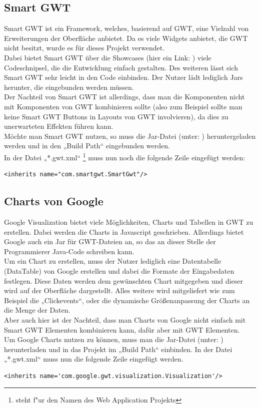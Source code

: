 \documentclass[12pt,a4paper,twoside]{article}
\begin{document}
\subsection{Smart GWT}
Smart GWT ist ein Framework, welches, basierend auf GWT, eine Vielzahl von Erweiterungen der Oberfläche anbietet. Da es viele Widgets anbietet, die GWT nicht besitzt, wurde es für dieses Projekt verwendet.\\
Dabei bietet Smart GWT über die Showcases (hier ein Link: \cite{smartgwt}) viele Codeschnipsel, die die Entwicklung  einfach gestalten. Des weiteren lässt sich Smart GWT sehr leicht in den Code einbinden. Der Nutzer lädt lediglich Jars herunter, die eingebunden werden müssen. \\
Der Nachteil von Smart GWT ist allerdings, dass man die Komponenten nicht mit Komponenten von GWT kombinieren sollte (also zum Beispiel sollte man keine Smart GWT Buttons in Layouts von GWT involvieren), da dies zu unerwarteten Effekten führen kann.\\
\newline
Möchte man Smart GWT nutzen, so muss die Jar-Datei (unter: \cite{smartgwtdown}) heruntergeladen werden und in den „Build Path“ eingebunden werden.\\
In der Datei „*.gwt.xml“ \footnote{steht f"ur den Namen des Web Application Projekts} muss nun noch die folgende Zeile eingefügt werden:

\lstset{language=HTML}
\begin{lstlisting}
<inherits name="com.smartgwt.SmartGwt"/>
\end{lstlisting}

\subsection{Charts von Google}
Google Visualization bietet viele Möglichkeiten, Charts und Tabellen in GWT zu erstellen. Dabei werden die Charts in Javascript geschrieben. Allerdings bietet Google auch ein Jar für GWT-Dateien an, so das an dieser Stelle der Programmierer Java-Code schreiben kann. \\
Um ein Chart zu erstellen, muss der Nutzer lediglich eine Datentabelle (DataTable) von Google erstellen und dabei die Formate der Eingabedaten festlegen. Diese Daten werden dem gewünschten Chart mitgegeben und dieser wird auf der Oberfläche dargestellt. Alles weitere wird mitgeliefert wie zum Beispiel die „Clickevents“, oder die dynamische Größenanpassung der Charts an die Menge der Daten.\\
Aber auch hier ist der Nachteil, dass man Charts von Google nicht einfach mit Smart GWT Elementen kombinieren kann, dafür aber mit GWT Elementen.\\
\newline
Um Google Charts nutzen zu können, muss man die Jar-Datei (unter: \cite{charts}) herunterladen und in das Projekt im „Build Path“ einbinden. In der Datei „*.gwt.xml“ muss nun die folgende Zeile eingefügt werden.
\lstset{language=HTML}
\begin{lstlisting}
<inherits name='com.google.gwt.visualization.Visualization'/>
\end{lstlisting}
\end{document}
